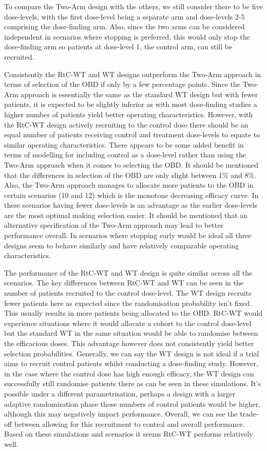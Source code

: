 To compare the Two-Arm design with the others, we still consider there to be five dose-levels, with the first dose-level being a separate arm and dose-levels 2-5 comprising the dose-finding arm. Also, since the two arms can be considered independent in scenarios where stopping is preferred, this would only stop the dose-finding arm so patients at dose-level 1, the control arm, can still be recruited.   

Consistently the RtC-WT and WT designs outperform the Two-Arm approach in terms of selection of the OBD if only by a few percentage points. Since the Two-Arm approach is essentially the same as the standard WT design but with fewer patients, it is expected to be slightly inferior as with most dose-finding studies a higher number of patients yield better operating characteristics. However, with the RtC-WT design actively recruiting to the control dose there should be an equal number of patients receiving control and treatment dose-levels to equate to similar operating characteristics. There appears to be some added benefit in terms of modelling for including control as a dose-level rather than using the Two-Arm approach when it comes to selecting the OBD. It should be mentioned that the differences in selection of the OBD are only slight between 1\% and 8\%. Also, the Two-Arm approach manages to allocate more patients to the OBD in certain scenarios (10 and 12) which is the monotone decreasing efficacy curve. In these scenarios having fewer dose-levels is an advantage as the earlier dose-levels are the most optimal making selection easier. It should be mentioned that an alternative specification of the Two-Arm approach may lead to better performance overall. In scenarios where stopping early would be ideal all three designs seem to behave similarly and have relatively comparable operating characteristics. 

The performance of the RtC-WT and WT design is quite similar across all the scenarios. The key differences between RtC-WT and WT can be seen in the number of patients recruited to the control dose-level. The WT design recruits fewer patients here as expected since the randomisation probability isn't fixed. This usually results in more patients being allocated to the OBD. RtC-WT would experience situations where it would allocate a cohort to the control dose-level but the standard WT in the same situation would be able to randomise between the efficacious doses. This advantage however does not consistently yield better selection probabilities. Generally, we can say the WT design is not ideal if a trial aims to recruit control patients whilst conducting a dose-finding study. However, in the case where the control dose has high enough efficacy, the WT design can successfully still randomise patients there as can be seen in these simulations. It's possible under a different parametrisation, perhaps a design with a larger adaptive randomisation phase those numbers of control patients would be higher, although this may negatively impact performance. Overall, we can see the trade-off between allowing for this recruitment to control and overall performance. Based on these simulations and scenarios it seems RtC-WT performs relatively well.

